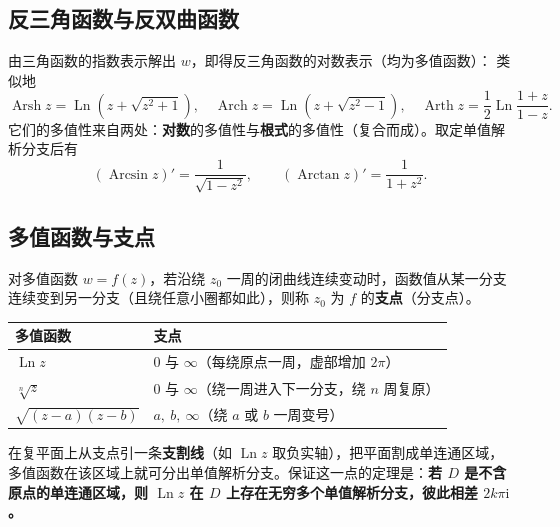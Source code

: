 \subsection{反三角函数与反双曲函数}
由三角函数的指数表示解出 \(w\)，即得反三角函数的对数表示（均为多值函数）：
类似地
\[
\operatorname{Arsh}z=\operatorname{Ln}\left(z+\sqrt{z^{2}+1}\right),\quad
\operatorname{Arch}z=\operatorname{Ln}\left(z+\sqrt{z^{2}-1}\right),\quad
\operatorname{Arth}z=\frac{1}{2}\operatorname{Ln}\frac{1+z}{1-z}.
\]
它们的多值性来自两处：\textbf{对数}的多值性与\textbf{根式}的多值性（复合而成）。取定单值解析分支后有
\[
(\operatorname{Arcsin}z)'=\frac{1}{\sqrt{1-z^{2}}},\qquad
(\operatorname{Arctan}z)'=\frac{1}{1+z^{2}}.
\]

\subsection{多值函数与支点}
对多值函数 \(w=f(z)\)，若沿绕 \(z_{0}\) 一周的闭曲线连续变动时，函数值从某一分支连续变到另一分支（且绕任意小圈都如此），则称 \(z_{0}\) 为 \(f\) 的\textbf{支点}（分支点）。

\begin{center}
\begin{tabular}{ll}
\toprule
多值函数 & 支点 \\
\midrule
\(\operatorname{Ln}z\) & \(0\) 与 \(\infty\)（每绕原点一周，虚部增加 \(2\pi\)） \\
\(\sqrt[n]{z}\) & \(0\) 与 \(\infty\)（绕一周进入下一分支，绕 \(n\) 周复原） \\
\(\sqrt{(z-a)(z-b)}\) & \(a,\ b,\ \infty\)（绕 \(a\) 或 \(b\) 一周变号） \\
\bottomrule
\end{tabular}
\end{center}

在复平面上从支点引一条\textbf{支割线}（如 \(\operatorname{Ln}z\) 取负实轴），把平面割成单连通区域，多值函数在该区域上就可分出单值解析分支。保证这一点的定理是：\textbf{若 \(D\) 是不含原点的单连通区域，则 \(\operatorname{Ln}z\) 在 \(D\) 上存在无穷多个单值解析分支，彼此相差 \(2k\pi\mathrm{i}\)。}


